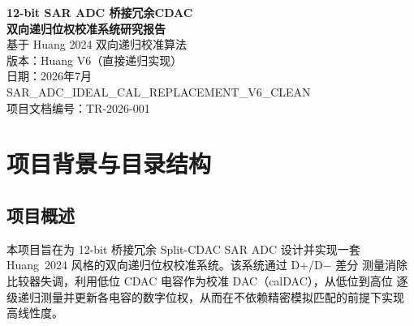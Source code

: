\documentclass[UTF8,a4paper,12pt]{ctexart}
\theoremstyle{definition}
\begin{document}

\begin{titlepage}
\centering
\vspace*{3cm}
{\Huge\bfseries 12-bit SAR ADC 桥接冗余CDAC\\[6pt]双向递归位权校准系统研究报告}\\[1.5cm]
{\large 基于 Huang 2024 双向递归校准算法}\\[1cm]
{\large 版本：Huang V6（直接递归实现）}\\[0.5cm]
{\large 日期：2026年7月}\\[3cm]

\vfill
{\large SAR\_ADC\_IDEAL\_CAL\_REPLACEMENT\_V6\_CLEAN}\\[0.3cm]
{\large 项目文档编号：TR-2026-001}
\end{titlepage}

\begin{abstract}
\noindent
本报告系统性地阐述一套面向 12-bit 桥接冗余 Split-CDAC SAR ADC 的双向递归位权
校准系统的设计与验证。项目历经 V5（架构设计阶段）、V6（3-target 原型实现）、
V6.2（发现 w2 re-correction 数学缺陷）、V6.3（缺陷修复与隐式 gauge 引入）、
V6.5（W5 粗调自动量程扩展）、V6.6（外部 anchor 通道合并）直至当前 Huang V6
（全直接递归二进制 CDAC 实现）的多次迭代演化。报告详细覆盖 CDAC 拓扑演化、
校准算法数学原理、版本历史与核心算法演化、数学可辨识性证明、方向与程度敏感性
分析、Dither 注入机制、文件清单与版本归档、仿真验证指南以及已知限制与未来工作。
所有结论均有严格的数学推导支撑（定理 1--6），并提供完整的 Verilog-A 与 RTL
实现参考。
\end{abstract}

\tableofcontents
\newpage

\section{项目背景与目录结构}

\subsection{项目概述}

本项目旨在为 12-bit 桥接冗余 Split-CDAC SAR ADC 设计并实现一套
Huang~2024\cite{huang2024} 风格的双向递归位权校准系统。该系统通过 D+/D$-$ 差分
测量消除比较器失调，利用低位 CDAC 电容作为校准 DAC（calDAC），从低位到高位
逐级递归测量并更新各电容的数字位权，从而在不依赖精密模拟匹配的前提下实现
高线性度。
\end{document}

